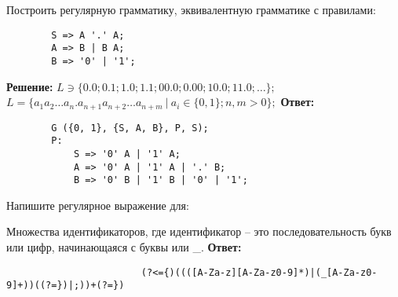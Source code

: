 \documentclass[]{article}
\begin{document}
\begin{enumerate}
\begin{item}
    Построить регулярную грамматику, эквивалентную грамматике с правилами:
    \begin{lstlisting}
        S => A '.' A;
        A => B | B A;
        B => '0' | '1';
    \end{lstlisting}

    \textbf{Решение:}
    \smallbreak
    $L \ni \{ 0.0; 0.1; 1.0; 1.1; 00.0; 0.00; 10.0; 11.0; \dots \};$
    \hfill\break$L = \{ a_1 a_2 \dots a_n . a_{n+1} a_{n+2} \dots a_{n+m} \ |\  a_i \in \{ 0, 1 \}; n, m > 0 \};$
    \bigbreak
    \textbf{Ответ:}
    \begin{lstlisting}
        G ({0, 1}, {S, A, B}, P, S);
        P:
            S => '0' A | '1' A;
            A => '0' A | '1' A | '.' B;
            B => '0' B | '1' B | '0' | '1';
    \end{lstlisting}
\end{item}

\begin{item}
    Напишите регулярное выражение для:
    \begin{enumerate}

        \begin{item}
            Множества идентификаторов, где идентификатор – это последовательность букв или цифр, начинающаяся с буквы или \_.
            \bigbreak
            \textbf{Ответ:}
            \begin{enumerate}

                \begin{item}
                    \begin{lstlisting}
                        (?<={)((([A-Za-z][A-Za-z0-9]*)|(_[A-Za-z0-9]+))((?=})|;))+(?=})
                    \end{lstlisting}
                \end{item}


\end{enumerate}
\end{item}
\end{enumerate}
\end{item}
\end{enumerate}
\end{document}
